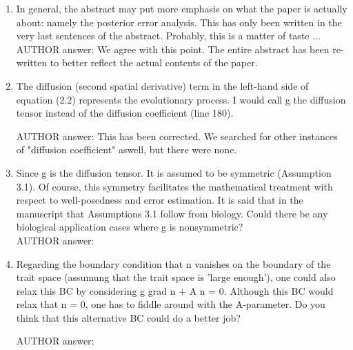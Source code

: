 \documentclass[a4paper,11pt]{scrartcl}
\begin{document}
\begin{enumerate}
\item
In general, the abstract may put more emphasis on what the paper is actually about: namely the posterior error analysis. This has only been written in the very last sentences of the abstract. Probably, this is a matter of taste ... \\

AUTHOR answer: We agree with this point. The entire abstract has been re-written to better reflect the actual contents of the paper.

\item
The diffusion (second spatial derivative) term in the left-hand side of equation (2.2) represents the evolutionary process. I would call g the diffusion tensor instead of the diffusion coefficient (line 180).

AUTHOR answer: This has been corrected. We searched for other instances of "diffusion coefficient" aswell, but there were none.

\item
Since g is the diffusion tensor. It is assumed to be symmetric (Assumption 3.1). Of course, this symmetry facilitates the mathematical treatment with respect to well-posedness and error estimation. It is said that in the manuscript that Assumptions 3.1 follow from biology. Could there be any biological application cases where g is nonsymmetric? \\

AUTHOR answer: 

\item
Regarding the boundary condition that n vanishes on the boundary of the trait space (assumung that the trait space is 'large enough'), one could also relax this BC by considering g grad n + A n = 0. Although this BC would relax that n = 0, one has to fiddle around with the A-parameter. Do you think that this alternative BC could do a better job?

AUTHOR answer: 


\end{enumerate}
\end{document}
